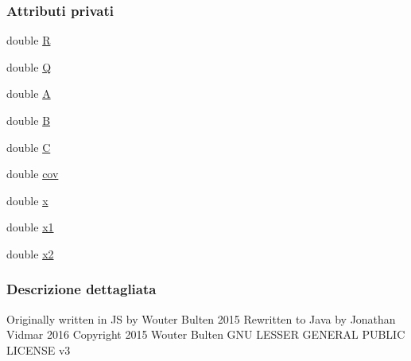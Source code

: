 \subsubsection*{Attributi privati}
\begin{DoxyCompactItemize}
\item 
double \hyperlink{classit_1_1unibo_1_1torsello_1_1bluetoothpositioning_1_1kalmanFilter_1_1KalmanFilter_ad9b73500bbbee6969b5cfbe1a6e7a5ab_ad9b73500bbbee6969b5cfbe1a6e7a5ab}{R}
\item 
double \hyperlink{classit_1_1unibo_1_1torsello_1_1bluetoothpositioning_1_1kalmanFilter_1_1KalmanFilter_a684136c1ebc53dab2d661e98e7485a0a_a684136c1ebc53dab2d661e98e7485a0a}{Q}
\item 
double \hyperlink{classit_1_1unibo_1_1torsello_1_1bluetoothpositioning_1_1kalmanFilter_1_1KalmanFilter_a5222a1da9d5ef7f961a870402a245c06_a5222a1da9d5ef7f961a870402a245c06}{A}
\item 
double \hyperlink{classit_1_1unibo_1_1torsello_1_1bluetoothpositioning_1_1kalmanFilter_1_1KalmanFilter_a50cc9b19f576bafde991715386e35f14_a50cc9b19f576bafde991715386e35f14}{B}
\item 
double \hyperlink{classit_1_1unibo_1_1torsello_1_1bluetoothpositioning_1_1kalmanFilter_1_1KalmanFilter_a0e605eaeec6a8d59254d45a6bbef2a52_a0e605eaeec6a8d59254d45a6bbef2a52}{C}
\item 
double \hyperlink{classit_1_1unibo_1_1torsello_1_1bluetoothpositioning_1_1kalmanFilter_1_1KalmanFilter_a9446f9ad4fbe8b2665e8109c9a22758e_a9446f9ad4fbe8b2665e8109c9a22758e}{cov}
\item 
double \hyperlink{classit_1_1unibo_1_1torsello_1_1bluetoothpositioning_1_1kalmanFilter_1_1KalmanFilter_acab8f5b6d2cec6daae8c6e5a300243cd_acab8f5b6d2cec6daae8c6e5a300243cd}{x}
\item 
double \hyperlink{classit_1_1unibo_1_1torsello_1_1bluetoothpositioning_1_1kalmanFilter_1_1KalmanFilter_a3c6dc655806d5f59d57602cad9d3003a_a3c6dc655806d5f59d57602cad9d3003a}{x1}
\item 
double \hyperlink{classit_1_1unibo_1_1torsello_1_1bluetoothpositioning_1_1kalmanFilter_1_1KalmanFilter_a6f38c2ce61663eb8393cdb4e37fef427_a6f38c2ce61663eb8393cdb4e37fef427}{x2}
\end{DoxyCompactItemize}


\subsubsection{Descrizione dettagliata}
Originally written in JS by Wouter Bulten 2015 Rewritten to Java by Jonathan Vidmar 2016 Copyright 2015 Wouter Bulten G\+NU L\+E\+S\+S\+ER G\+E\+N\+E\+R\+AL P\+U\+B\+L\+IC L\+I\+C\+E\+N\+SE v3 

